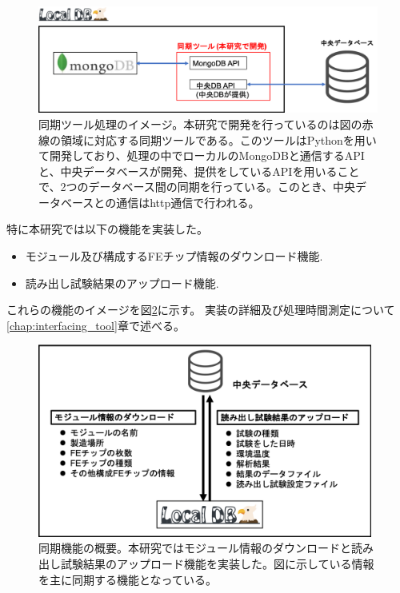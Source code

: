 \begin{figure}[bpt]\centering
\includegraphics[width=13cm]{./interfacing_tools_system.png}
\caption[同期ツール処理のイメージ]{同期ツール処理のイメージ。本研究で開発を行っているのは図の赤線の領域に対応する同期ツールである。このツールはPythonを用いて開発しており、処理の中でローカルのMongoDBと通信するAPIと、中央データベースが開発、提供をしているAPIを用いることで、2つのデータベース間の同期を行っている。このとき、中央データベースとの通信はhttp通信で行われる。}
\label{interfacing_tools_system}
\end{figure}

特に本研究では以下の機能を実装した。
\begin{itemize}
  \item モジュール及び構成するFEチップ情報のダウンロード機能.
  \item 読み出し試験結果のアップロード機能.
\end{itemize}

これらの機能のイメージを図\ref{interface_overview}に示す。
実装の詳細及び処理時間測定について\ref{chap:interfacing_tool}章で述べる。

\begin{figure}[bpt]\centering
\includegraphics[width=11cm]{./interface_overview.png}
\caption[同期機能の概要]{同期機能の概要。本研究ではモジュール情報のダウンロードと読み出し試験結果のアップロード機能を実装した。図に示している情報を主に同期する機能となっている。}
\label{interface_overview}
\end{figure}

